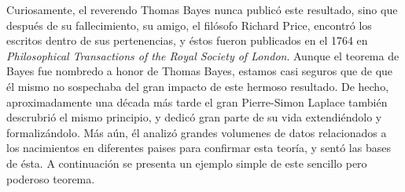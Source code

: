 \documentclass[
  spanish,
  letter]{book}
\theoremstyle{definition}
\theoremstyle{definition}
\theoremstyle{definition}
\theoremstyle{remark}
\begin{document}
Curiosamente, el reverendo Thomas Bayes nunca publicó este resultado, sino que después de su fallecimiento, su amigo, el filósofo Richard Price, encontró los escritos dentro de sus pertenencias, y éstos fueron publicados en el 1764 en \emph{Philosophical Transactions of the Royal Society of London}. Aunque el teorema de Bayes fue nombredo a honor de Thomas Bayes, estamos casi seguros que de que él mismo no sospechaba del gran impacto de este hermoso resultado. De hecho, aproximadamente una década más tarde el gran Pierre-Simon Laplace también descrubrió el mismo principio, y dedicó gran parte de su vida extendiéndolo y formalizándolo. Más aún, él analizó grandes volumenes de datos relacionados a los nacimientos en diferentes paises para confirmar esta teoría, y sentó las bases de ésta. A continuación se presenta un ejemplo simple de este sencillo pero poderoso teorema.
\end{document}
